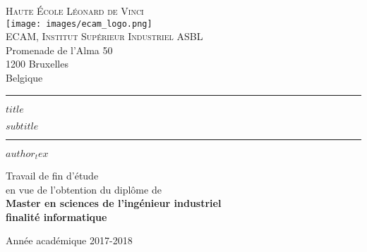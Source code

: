 \documentclass[
    $if(papersize)$
        $papersize$,
    $else$
        a4paper,
    $endif$
    $if(fontsize)$
        $fontsize$,
    $else$
        11pt,
    $endif$
    oneside
]{report}
\begin{document}
    \begin{titlepage}
        \sffamily

        \begin{center}
            \large
            \textsc{Haute École Léonard de Vinci} \\
            \centering
            \texttt{[image: images/ecam\_logo.png]} \\
            \textsc{ECAM, Institut Supérieur Industriel ASBL} \\
            {\small
                Promenade de l'Alma 50 \\
                1200 Bruxelles \\
                Belgique
            }
        \end{center}


        \begin{center}
            \rule{\textwidth}{1pt}
            {\huge\bfseries
                $title$ \par
            }
            \vspace{\baselineskip}
            {\LARGE\bfseries
                $subtitle$
            }
            \rule{\textwidth}{1pt}
        \end{center}


        \begin{center}
            {\Large
                $author_tex$
            }
        \end{center}


        \begin{center}
            {\large
                Travail de fin d'étude \\
                en vue de l'obtention du diplôme de \\
                \textbf{
                    Master en sciences de l'ingénieur industriel \\
                    finalité informatique
                }
            }
        \end{center}


        \vfill

        \begin{center}
            {\large
                Année académique 2017-2018
            }
        \end{center}

        \normalfont
        \thispagestyle{empty}
    \end{titlepage}
\end{document}
